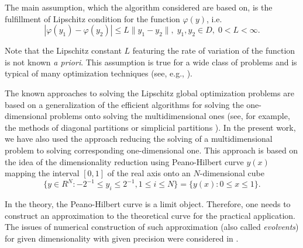 \documentclass[runningheads]{llncs}
\begin{document}
The main assumption, which the algorithm considered are based on, is the fulfillment of Lipschitz condition for the function $\varphi(y)$, i.e.
\begin{equation} \label{lip_ref}
\left| \varphi(y_1) - \varphi(y_2) \right| \leq L\|y_1 - y_2\|, \; y_1, y_2 \in D, \; 0 < L < \infty.
\end{equation}

Note that the Lipschitz constant $L$ featuring the rate of variation of the function is not known \textit{a priori}. This assumption is true for a wide class of problems and is typical of many optimization techniques (see, e.g., \cite{Evtushenko2013,Jones2009,Paulavicius2014}).

The known approaches to solving the Lipschitz global optimization problems are based on a generalization of the efficient algorithms for solving the one-dimensional problems onto solving the multidimensional ones (see, for example, the methods of diagonal partitions \cite{Sergeyev2017} or simplicial partitions \cite{PaulaviciusZilinskas2014}). In the present work, we have also used the approach reducing the solving of a multidimensional problem to solving corresponding one-dimensional one. This approach is based on the idea of the dimensionality reduction using Peano-Hilbert curve $y(x)$ mapping the interval $[0,1]$ of the real axis onto an $N$-dimensional cube 
\begin{equation} \label{n_dem_cube_ref}
\{ y \in R^{N}: -2^{-1} \leq y_i \leq 2^{-1}, 1 \leq i \leq N\} = \{y(x): 0 \leq x \leq 1 \}.
\end{equation}

In the theory, the Peano-Hilbert curve is a limit object. Therefore, one needs to construct an approximation to the theoretical curve for the practical application. The issues of numerical construction of such approximation (also called \textit{evolvents}) for given dimensionality with given precision were considered in \cite{Sergeyev2013}.
\end{document}

